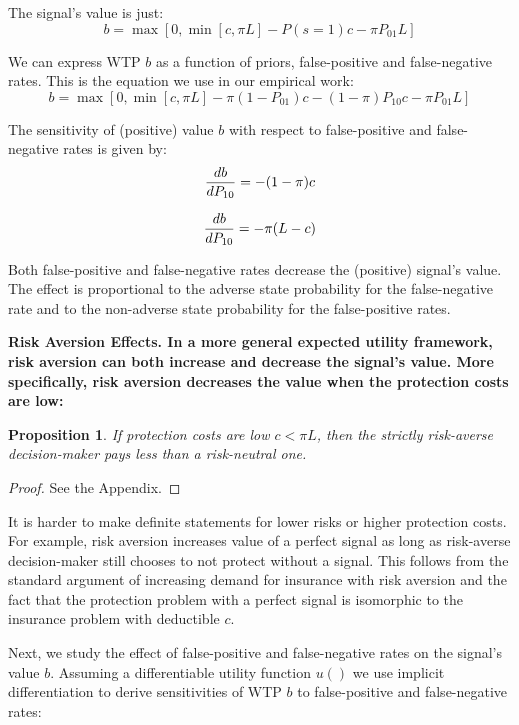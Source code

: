 \documentclass[12pt,a4paper]{article}
\newtheorem{theorem}{Proposition}
\begin{document}
The signal's value is just:
\begin{equation}
b=\max[0,\min[c,\pi L]-P(s=1)c-\pi P_{01}L]
\end{equation}

We can express WTP $b$ as a function of priors, false-positive and false-negative rates. This is the equation we use in our empirical work:
\begin{equation}
b=\max[0,\min[c,\pi L]-\pi (1-P_{01})c-(1-\pi)P_{10}c-\pi P_{01}L]
\end{equation}

The sensitivity of (positive) value $b$ with respect to false-positive and false-negative rates is given by:
\begin{equation}
{db\over dP_{10}}=-(1-\pi)c
\end{equation}

\begin{equation}
{db\over dP_{10}}=-\pi(L-c)
\end{equation}
\vspace{10pt}

Both false-positive and false-negative rates decrease the (positive) signal's value. The effect is proportional to the adverse state probability for the false-negative rate and to the non-adverse state probability for the false-positive rates.

\vspace{10pt}
\bf Risk Aversion Effects. \rm In a more general expected utility framework, risk aversion can both increase and decrease the signal's value. More specifically, risk aversion decreases the value when the protection costs are low: 

\begin{theorem}
 If protection costs are low $c<\pi L$, then the strictly risk-averse decision-maker pays less than a risk-neutral one.
\end{theorem} 
\begin{proof}
See the Appendix.
\end{proof}
It is harder to make definite statements for lower risks or higher protection costs. For example, risk aversion increases value of a perfect signal as long as risk-averse decision-maker still chooses to not protect without a signal. This follows from the standard argument of increasing demand for insurance with risk aversion and the fact that the protection problem with a perfect signal is isomorphic to the insurance problem with deductible $c$. 

Next, we study the effect of false-positive and false-negative rates on the signal's value $b$. Assuming a differentiable utility function $u()$ we use implicit differentiation to derive sensitivities of WTP $b$ to false-positive and false-negative rates:
\end{document}
